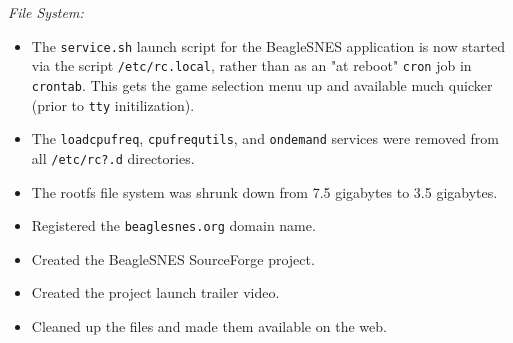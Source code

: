\noindent{}\emph{File System:}
\begin{itemize}
\item The \texttt{service.sh} launch script for the BeagleSNES application is now started via the script \texttt{/etc/rc.local}, rather than as an "at reboot" \texttt{cron} job in \texttt{crontab}.  This gets the game selection menu up and available much quicker (prior to \texttt{tty} initilization).
\item The \texttt{loadcpufreq}, \texttt{cpufrequtils}, and \texttt{ondemand} services were removed from all \texttt{/etc/rc?.d} directories.
\item The rootfs file system was shrunk down from 7.5 gigabytes to 3.5 gigabytes.
\end{itemize}
\begin{itemize}
\item Registered the \texttt{beaglesnes.org} domain name.
\item Created the BeagleSNES SourceForge project.
\item Created the project launch trailer video.
\item Cleaned up the files and made them available on the web.
\end{itemize}
